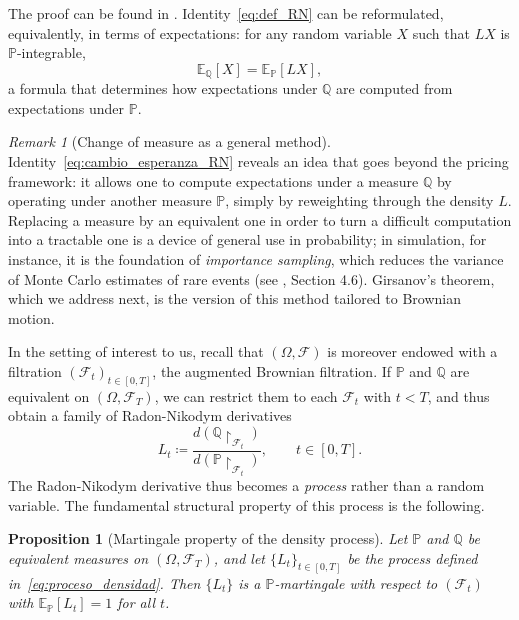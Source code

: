 \documentclass[11pt,a4paper,oneside]{report}
\theoremstyle{plain}
\newtheorem{proposicion}[teorema]{Proposition}
\theoremstyle{definition}
\theoremstyle{remark}
\newtheorem{observacion}[teorema]{Remark}
\newcommand{\E}{\mathbb{E}}
\newcommand{\PP}{\mathbb{P}}
\newcommand{\Q}{\mathbb{Q}}
\newcommand{\F}{\mathcal{F}}
\newcommand{\1}{\mathbf{1}}
\newcommand{\eqdef}{\coloneqq}
\begin{document}
The proof can be found in \cite{williams}.
Identity~\eqref{eq:def_RN} can be reformulated, equivalently, in
terms of expectations: for any random variable $X$ such that $L X$ is
$\PP$-integrable,
\begin{equation}\label{eq:cambio_esperanza_RN}
  \E_\Q[X] = \E_\PP[L X],
\end{equation}
a formula that determines how expectations under $\Q$ are computed
from expectations under $\PP$.

\begin{observacion}[Change of measure as a general method]
\label{obs:cambio_medida_general}
Identity~\eqref{eq:cambio_esperanza_RN} reveals an idea that goes
beyond the pricing framework: it allows one to compute expectations
under a measure $\Q$ by operating under another measure $\PP$, simply
by reweighting through the density $L$. Replacing a measure by an
equivalent one in order to turn a difficult computation into a
tractable one is a device of general use in probability; in
simulation, for instance, it is the foundation of \emph{importance
sampling}, which reduces the variance of Monte Carlo estimates of
rare events (see \cite{glasserman}, Section 4.6). Girsanov's theorem, which we address next, is the
version of this method tailored to Brownian motion.
\end{observacion}

In
the setting of interest to us, recall that $(\Omega, \F)$ is
moreover endowed with a filtration $(\F_t)_{t \in [0, T]}$, the
augmented Brownian filtration. If $\PP$ and $\Q$ are equivalent on
$(\Omega, \F_T)$, we can restrict them to each $\F_t$ with $t < T$,
and thus obtain a family of Radon-Nikodym derivatives
\begin{equation}\label{eq:proceso_densidad}
  L_t \eqdef \frac{d(\Q\!\restriction_{\F_t})}{d(\PP\!\restriction_{\F_t})},
  \qquad t \in [0, T].
\end{equation}
The Radon-Nikodym derivative thus becomes a \emph{process} rather
than a random variable. The fundamental structural property of this
process is the following.

\begin{proposicion}[Martingale property of the density process]
\label{prop:martingala_densidad}
Let $\PP$ and $\Q$ be equivalent measures on $(\Omega, \F_T)$, and
let $\{L_t\}_{t \in [0, T]}$ be the process defined
in~\eqref{eq:proceso_densidad}. Then $\{L_t\}$ is a $\PP$-martingale
with respect to $(\F_t)$ with $\E_\PP[L_t] = 1$ for all $t$.
\end{proposicion}
\end{document}
